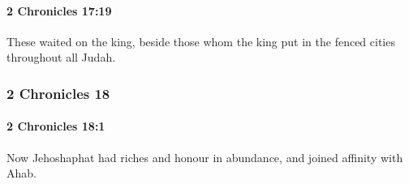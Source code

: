 		\paragraph{2 Chronicles 17:19} %
			\label{2CHRONICLES-17-19}

			These waited on the king, beside those whom the king put in the fenced cities throughout all Judah.

	\subsubsection{2 Chronicles 18} %
		\label{2CHRONICLES-18}

		\paragraph{2 Chronicles 18:1} %
			\label{2CHRONICLES-18-1}

			Now Jehoshaphat had riches and honour in abundance, and joined affinity with Ahab.

